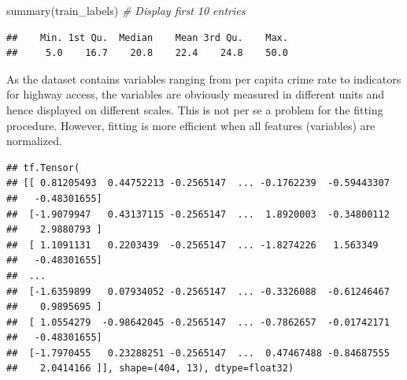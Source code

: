 \documentclass[
  12pt,
]{style/krantz}
\newenvironment{Shaded}{\begin{snugshade}}{\end{snugshade}}
\newcommand{\AttributeTok}[1]{\textcolor[rgb]{0.77,0.63,0.00}{#1}}
\newcommand{\CommentTok}[1]{\textcolor[rgb]{0.56,0.35,0.01}{\textit{#1}}}
\newcommand{\FunctionTok}[1]{\textcolor[rgb]{0.00,0.00,0.00}{#1}}
\newcommand{\NormalTok}[1]{#1}
\newcommand{\OtherTok}[1]{\textcolor[rgb]{0.56,0.35,0.01}{#1}}
\newcommand{\SpecialCharTok}[1]{\textcolor[rgb]{0.00,0.00,0.00}{#1}}
\begin{document}
\begin{Shaded}
\begin{Highlighting}[]
\FunctionTok{summary}\NormalTok{(train\_labels) }\CommentTok{\# Display first 10 entries}
\end{Highlighting}
\end{Shaded}

\begin{verbatim}
##    Min. 1st Qu.  Median    Mean 3rd Qu.    Max. 
##     5.0    16.7    20.8    22.4    24.8    50.0
\end{verbatim}

As the dataset contains variables ranging from per capita crime rate to indicators for highway access, the variables are obviously measured in different units and hence displayed on different scales. This is not per se a problem for the fitting procedure. However, fitting is more efficient when all features (variables) are normalized.

\begin{Shaded}
\end{Shaded}

\begin{verbatim}
## tf.Tensor(
## [[ 0.81205493  0.44752213 -0.2565147  ... -0.1762239  -0.59443307
##   -0.48301655]
##  [-1.9079947   0.43137115 -0.2565147  ...  1.8920003  -0.34800112
##    2.9880793 ]
##  [ 1.1091131   0.2203439  -0.2565147  ... -1.8274226   1.563349
##   -0.48301655]
##  ...
##  [-1.6359899   0.07934052 -0.2565147  ... -0.3326088  -0.61246467
##    0.9895695 ]
##  [ 1.0554279  -0.98642045 -0.2565147  ... -0.7862657  -0.01742171
##   -0.48301655]
##  [-1.7970455   0.23288251 -0.2565147  ...  0.47467488 -0.84687555
##    2.0414166 ]], shape=(404, 13), dtype=float32)
\end{verbatim}
\end{document}
